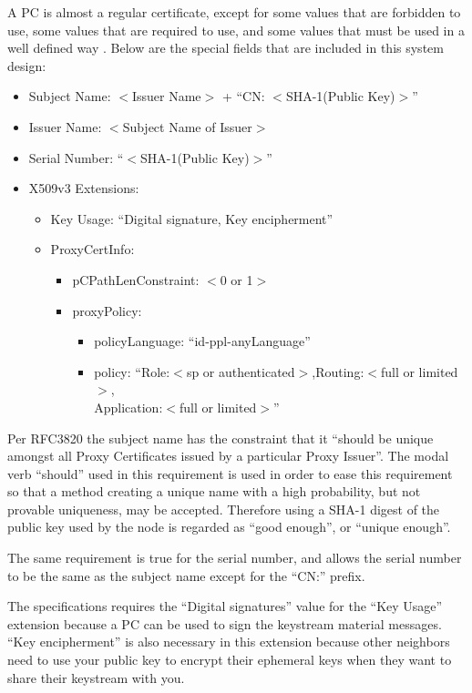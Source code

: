A \ac{PC} is almost a regular certificate, except for some values that are
forbidden to use, some values that are required to use, and some values that
must be used in a well defined way \cite{rfc3820}. Below are the special fields
that are included in this system design:
\begin{itemize}
  \item Subject Name: $<$Issuer Name$>$ + ``CN: $<$SHA-1(Public Key)$>$''
  \item Issuer Name: $<$Subject Name of Issuer$>$
  \item Serial Number: ``$<$SHA-1(Public Key)$>$''
  \item X509v3 Extensions:
  \begin{itemize}
    \item Key Usage: ``Digital signature, Key encipherment''
    \item ProxyCertInfo:
    \begin{itemize}
      \item pCPathLenConstraint: $<$0 or 1$>$
      \item proxyPolicy: 
      \begin{itemize}
        \item policyLanguage: ``id-ppl-anyLanguage''
        \item policy: ``Role:$<$sp or authenticated$>$,Routing:$<$full or
        limited$>$,\\Application:$<$full or limited$>$''
      \end{itemize}
    \end{itemize}
  \end{itemize}
\end{itemize}
Per RFC3820 \cite{rfc3820} the subject name has the constraint that it
``should be unique amongst all Proxy Certificates issued by a particular Proxy
Issuer''. The modal verb ``should'' used in this requirement is used in order
to ease this requirement so that a method creating a unique name with a high
probability, but not provable uniqueness, may be accepted. Therefore using a
SHA-1 digest of the public key used by the node is regarded as ``good enough'',
or ``unique enough''.

The same requirement is true for the serial number, and allows the serial number
to be the same as the subject name except for the ``CN:'' prefix.

The specifications requires the ``Digital signatures'' value for the ``Key
Usage'' extension because a \ac{PC} can be used to sign the keystream material
messages. ``Key encipherment'' is also necessary in this extension because other
neighbors need to use your public key to encrypt their ephemeral keys when they
want to share their keystream with you.


